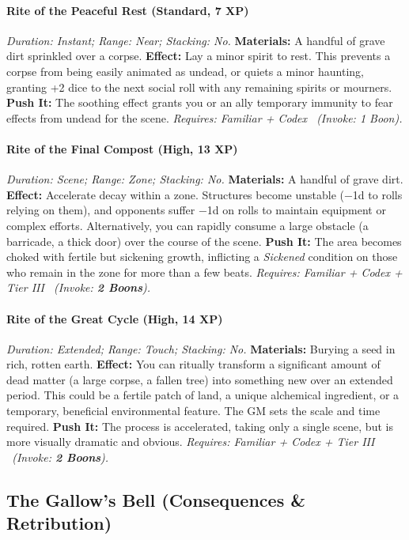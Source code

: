\documentclass[12pt,twoside]{book}
\begin{document}
\paragraph{Rite of the Peaceful Rest (Standard, 7 XP)} \emph{Duration: Instant; Range: Near; Stacking: No.}
\textbf{Materials:} A handful of grave dirt sprinkled over a corpse.
\textbf{Effect:} Lay a minor spirit to rest. This prevents a corpse from being easily animated as undead, or quiets a minor haunting, granting +2 dice to the next social roll with any remaining spirits or mourners.
\textbf{Push It:} The soothing effect grants you or an ally temporary immunity to fear effects from undead for the scene.
\emph{Requires: Familiar + Codex \ (\textit{Invoke:} 1 Boon).}
\paragraph{Rite of the Final Compost (High, 13 XP)} \emph{Duration: Scene; Range: Zone; Stacking: No.}
\textbf{Materials:} A handful of grave dirt.
\textbf{Effect:} Accelerate decay within a zone. Structures become unstable (−1d to rolls relying on them), and opponents suffer −1d on rolls to maintain equipment or complex efforts. Alternatively, you can rapidly consume a large obstacle (a barricade, a thick door) over the course of the scene.
\textbf{Push It:} The area becomes choked with fertile but sickening growth, inflicting a \emph{Sickened} condition on those who remain in the zone for more than a few beats.
\emph{Requires: Familiar + Codex + Tier III \ (\textit{Invoke:} \textbf{2 Boons}).}
\paragraph{Rite of the Great Cycle (High, 14 XP)} \emph{Duration: Extended; Range: Touch; Stacking: No.}
\textbf{Materials:} Burying a seed in rich, rotten earth.
\textbf{Effect:} You can ritually transform a significant amount of dead matter (a large corpse, a fallen tree) into something new over an extended period. This could be a fertile patch of land, a unique alchemical ingredient, or a temporary, beneficial environmental feature. The GM sets the scale and time required.
\textbf{Push It:} The process is accelerated, taking only a single scene, but is more visually dramatic and obvious.
\emph{Requires: Familiar + Codex + Tier III \ (\textit{Invoke:} \textbf{2 Boons}).}

\subsection{The Gallow's Bell (Consequences \& Retribution)}
\end{document}
